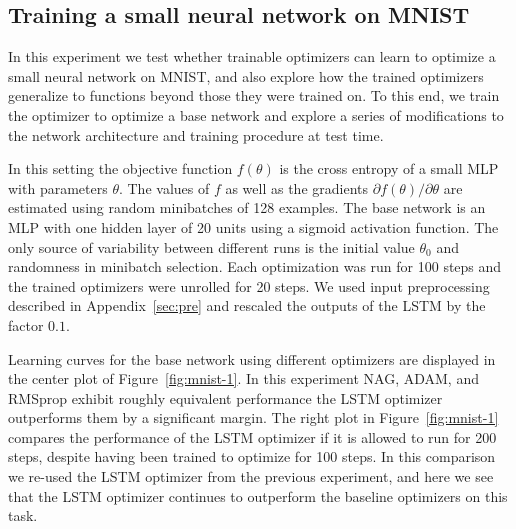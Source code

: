 \subsection{Training a small neural network on MNIST}

In this experiment we test whether trainable optimizers can learn to optimize a
small neural network on MNIST, and also explore how the trained optimizers
generalize to functions beyond those they were trained on.  To this end, we
train the optimizer to optimize a base network and explore a series of
modifications to the network architecture and training procedure at test time.


In this setting the objective function $f(\theta)$ is the cross entropy of a
small MLP with parameters $\theta$. The values of $f$ as well as the gradients
$\partial f(\theta) / \partial\theta$ are estimated using random minibatches of
128 examples. The base network is an MLP with one hidden layer of 20 units
using a sigmoid activation function. The only source of variability between
different runs is the initial value $\theta_0$ and randomness in minibatch
selection. Each optimization was run for 100 steps and the trained optimizers
were unrolled for 20 steps. We used input preprocessing described in
Appendix~\ref{sec:pre} and rescaled the outputs of the LSTM by the factor
$0.1$.

Learning curves for the base network using different optimizers are displayed
in the center plot of Figure~\ref{fig:mnist-1}. In this experiment NAG, ADAM,
and RMSprop exhibit roughly equivalent performance the LSTM optimizer
outperforms them by a significant margin. The right plot in
Figure~\ref{fig:mnist-1} compares the performance of the LSTM optimizer if it
is allowed to run for 200 steps, despite having been trained to optimize for
100 steps.  In this comparison we re-used the LSTM optimizer from the previous
experiment, and here we see that the LSTM optimizer continues to outperform the
baseline optimizers on this task.

